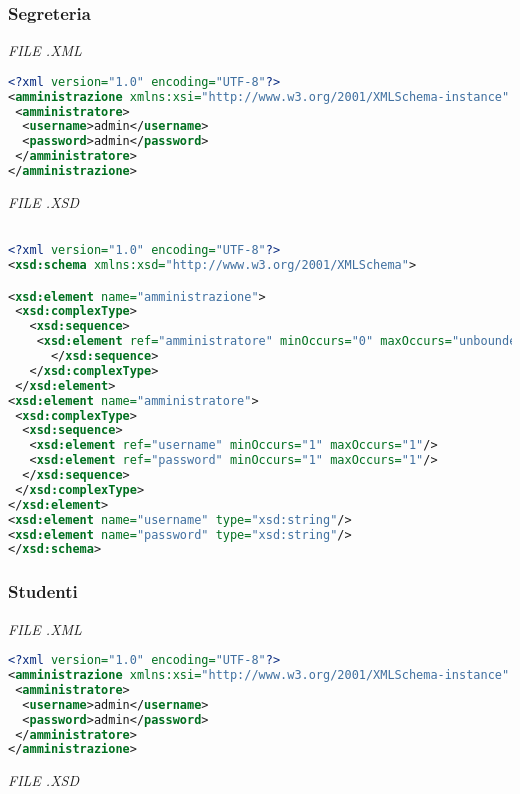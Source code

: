 \documentclass [a4paper,11pt]{book}
\begin{document}
\medskip

\subsubsection{Segreteria}

\emph{FILE .XML}

\begin{lstlisting}[language=XML]
<?xml version="1.0" encoding="UTF-8"?>
<amministrazione xmlns:xsi="http://www.w3.org/2001/XMLSchema-instance" xsi:noNamespaceSchemaLocation="amministrazione.xsd">
 <amministratore>
  <username>admin</username>
  <password>admin</password>
 </amministratore>
</amministrazione>
\end{lstlisting}

\emph{FILE .XSD}

\begin{lstlisting}[language=XML]

<?xml version="1.0" encoding="UTF-8"?>
<xsd:schema xmlns:xsd="http://www.w3.org/2001/XMLSchema">

<xsd:element name="amministrazione">
 <xsd:complexType>
   <xsd:sequence>
    <xsd:element ref="amministratore" minOccurs="0" maxOccurs="unbounded" />
      </xsd:sequence>
   </xsd:complexType>
 </xsd:element>
<xsd:element name="amministratore">
 <xsd:complexType>
  <xsd:sequence>
   <xsd:element ref="username" minOccurs="1" maxOccurs="1"/>
   <xsd:element ref="password" minOccurs="1" maxOccurs="1"/>
  </xsd:sequence>
 </xsd:complexType>
</xsd:element>
<xsd:element name="username" type="xsd:string"/>
<xsd:element name="password" type="xsd:string"/>
</xsd:schema>
\end{lstlisting}

\medskip

\subsubsection{Studenti}

\emph{FILE .XML}

\begin{lstlisting}[language=XML]
<?xml version="1.0" encoding="UTF-8"?>
<amministrazione xmlns:xsi="http://www.w3.org/2001/XMLSchema-instance" xsi:noNamespaceSchemaLocation="amministrazione.xsd">
 <amministratore>
  <username>admin</username>
  <password>admin</password>
 </amministratore>
</amministrazione>
\end{lstlisting}

\emph{FILE .XSD}
\end{document}
